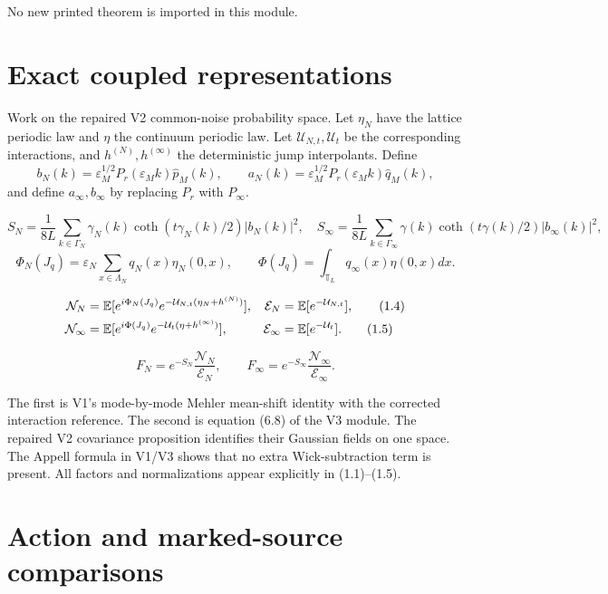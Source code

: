 \documentclass[11pt,a4paper]{article}
\newcommand{\eps}{\varepsilon}
\newcommand{\T}{\mathbb T}
\newcommand{\U}{\mathcal U}
\newcommand{\cth}{\operatorname{coth}}
\begin{document}
No new printed theorem is imported in this module.

\section{Exact coupled representations}

Work on the repaired V2 common-noise probability space.  Let $\eta_N$ have the
lattice periodic law and $\eta$ the continuum periodic law.  Let
$\U_{N,t},\U_t$ be the corresponding interactions, and
$h^{(N)},h^{(\infty)}$ the deterministic jump interpolants.  Define
\[
 b_N(k)=\eps_M^{1/2}P_r(\eps_Mk)\widehat p_M(k),\qquad
 a_N(k)=\eps_M^{1/2}P_r(\eps_Mk)\widehat q_M(k),
\tag{1.1}
\]
and define $a_\infty,b_\infty$ by replacing $P_r$ with $P_\infty$.


\[
 S_N=\frac1{8L}\sum_{k\in\Gamma_N}
 \gamma_N(k)\cth(t\gamma_N(k)/2)|b_N(k)|^2,
\quad
 S_\infty=\frac1{8L}\sum_{k\in\Gamma_\infty}
 \gamma(k)\cth(t\gamma(k)/2)|b_\infty(k)|^2,
\tag{1.2}
\]
\[
 \Phi_N(J_q)=\eps_N\sum_{x\in\Lambda_N}q_N(x)\eta_N(0,x),\qquad
 \Phi(J_q)=\int_{\T_L}q_\infty(x)\eta(0,x)dx.
\tag{1.3}
\]

\begin{align}
 \mathcal N_N&=\E[e^{i\Phi_N(J_q)}
 e^{-\U_{N,t}(\eta_N+h^{(N)})}],&
 \mathcal E_N&=\E[e^{-\U_{N,t}}],\tag{1.4}\\
 \mathcal N_\infty&=\E[e^{i\Phi(J_q)}
 e^{-\U_t(\eta+h^{(\infty)})}],&
 \mathcal E_\infty&=\E[e^{-\U_t}].\tag{1.5}
\end{align}

\[
 F_N=e^{-S_N}\frac{\mathcal N_N}{\mathcal E_N},
 \qquad
 F_\infty=e^{-S_\infty}\frac{\mathcal N_\infty}{\mathcal E_\infty}.
\tag{1.6}
\]

\Because The first is V1's mode-by-mode Mehler mean-shift identity with the
corrected interaction reference.  The second is equation (6.8) of the V3 module.
The repaired V2 covariance proposition identifies their Gaussian fields on one
space.  The Appell formula in V1/V3 shows that no extra Wick-subtraction term is
present.  All factors and normalizations appear explicitly in (1.1)--(1.5).

\QedStep

\section{Action and marked-source comparisons}
\end{document}
